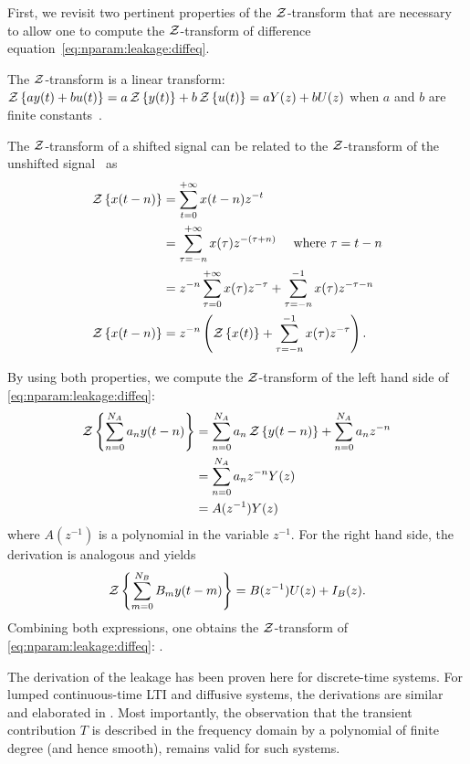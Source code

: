 First, we revisit two pertinent properties of the $\operatorname{\mathcal{Z}}$-transform that are necessary to allow one to compute the $\operatorname{\mathcal{Z}}$-transform of difference equation~\eqref{eq:nparam:leakage:diffeq}.
\begin{property}
The $\operatorname{\mathcal{Z}}$-transform is a linear transform: $\operatorname{\mathcal{Z}} \left\{ ay(t) + bu(t) \right\} = a \operatorname{\mathcal{Z}} \left\{ y(t) \right\} + b \operatorname{\mathcal{Z}} \left\{ u(t) \right\}= aY(z) + bU(z)$ when $a$ and $b$ are finite constants~\citep[Section 10.5.1]{Oppenheim1996}.
\end{property}
\begin{property}
The $\operatorname{\mathcal{Z}}$-transform of a shifted signal can be related to the $\operatorname{\mathcal{Z}}$-transform of the unshifted signal~\citep[Section 10.5.2]{Oppenheim1996} as
\begin{align}
  \operatorname{\mathcal{Z}} \left\{ x(t-n) \right\} 
  &= \sum_{t=0}^{+\infty} x(t-n) z^{-t} \\
  &= \sum_{\tau = -n}^{+\infty} x(\tau) z^{-(\tau + n)} \quad \text{ where } \tau = t - n\\
  &= z^{-n} \sum_{\tau = 0}^{+\infty} x(\tau) z^{-\tau} +  \sum_{\tau = -n}^{-1} x(\tau) z^{-\tau-n}\\
  \operatorname{\mathcal{Z}} \left\{ x(t-n) \right\} &= z^{-n} \left( \operatorname{\mathcal{Z}} \left\{ x(t) \right\} + \sum_{\tau = -n}^{-1} x(\tau) z^{-\tau} \right)
  \text{.}
\end{align}
\end{property}

By using both properties, we compute the $\operatorname{\mathcal{Z}}$-transform of the left hand side of \eqref{eq:nparam:leakage:diffeq}:
\begin{align}
  \operatorname{\mathcal{Z}} \left\{ \sum_{n=0}^{N_{A}} a_n y(t-n) \right\}
  &=
  \sum_{n=0}^{N_{A}} a_n \operatorname{\mathcal{Z}} \left\{ y(t-n) \right\}
  +\sum_{n=0}^{N_{A}} a_n z^{-n} \\
  &=
  \sum_{n=0}^{N_{A}} a_n  z^{-n} Y(z)\\
  &=
  A(z^{-1}) Y(z)
\end{align}
where $A(z^{-1})$ is a polynomial in the variable $z^{-1}$.
For the right hand side, the derivation is analogous and yields
\begin{equation}
  \operatorname{\mathcal{Z}} \left\{ \sum_{m=0}^{N_{B}} B_m y(t-m) \right\} =
  B(z^{-1}) U(z) + I_{B}(z)
  \text{.}
\end{equation}
Combining both expressions, one obtains the $\operatorname{\mathcal{Z}}$-transform of \eqref{eq:nparam:leakage:diffeq}:
.



\begin{remark}
The derivation of the leakage has been proven here for discrete-time systems.
For lumped continuous-time \gls{LTI} and diffusive systems, the derivations are similar and elaborated in \citet[Appendix 6.B]{Pintelon2012}.
Most importantly, the observation that the transient contribution $T$ is described in the frequency domain by a polynomial of finite degree (and hence smooth), remains valid for such systems.
\end{remark}

